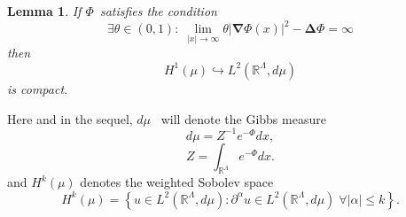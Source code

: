 \documentclass{article}
\newtheorem{lemma}[theorem]{Lemma}
\begin{document}
\begin{lemma}
\textit{If }$\Phi $\textit{\ satisfies the condition }%
\begin{equation*}
\exists \theta \in (0,1):\;\lim\limits_{\left| x\right| \rightarrow \infty
}\theta \left| \mathbf{\nabla }\Phi (x)\right| ^{2}-\mathbf{\Delta }\Phi
=\infty
\end{equation*}%
\textit{then }%
\begin{equation*}
H^{1}(\mu )\hookrightarrow L^{2}(\mathbb{R}^{\Lambda },d\mu )
\end{equation*}%
\textit{is compact.}
\end{lemma}

Here and in the sequel, $d\mu $ \ will denote the Gibbs measure%
\begin{equation*}
d\mu =Z^{-1}e^{-\Phi }dx,
\end{equation*}%
\begin{equation*}
Z=\int_{\mathbb{R}^{\Lambda }}e^{-\Phi }dx.
\end{equation*}%
and $H^{k}(\mu )$ denotes the weighted Sobolev space 
\begin{equation*}
H^{k}(\mu )=\left\{ u\in L^{2}(\mathbb{R}^{\Lambda },d\mu ):\partial
^{\alpha }u\in L^{2}(\mathbb{R}^{\Lambda },d\mu )\;\forall \left| \alpha
\right| \leq k\right\} .
\end{equation*}
\end{document}
